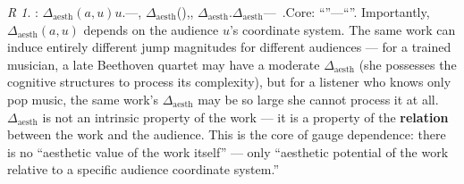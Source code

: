 \documentclass[12pt,a4paper]{article}
\theoremstyle{remark}
\newtheorem{remark}[theorem]Remark
\newcommand{\AesthDelta}{\Delta_{\text{aesth}}}
\begin{document}
\begin{remark}
: $\AesthDelta(a, u)$$u$.---, $\AesthDelta$(),, $\AesthDelta$.$\AesthDelta$---\ .Core: ``''---``''.
Importantly, $\AesthDelta(a, u)$ depends on the audience $u$'s coordinate system. The same work can induce entirely different jump magnitudes for different audiences --- for a trained musician, a late Beethoven quartet may have a moderate $\AesthDelta$ (she possesses the cognitive structures to process its complexity), but for a listener who knows only pop music, the same work's $\AesthDelta$ may be so large she cannot process it at all. $\AesthDelta$ is not an intrinsic property of the work --- it is a property of the \textbf{relation} between the work and the audience. This is the core of gauge dependence: there is no ``aesthetic value of the work itself'' --- only ``aesthetic potential of the work relative to a specific audience coordinate system.''
\end{remark}
\subsection{}
\end{document}
